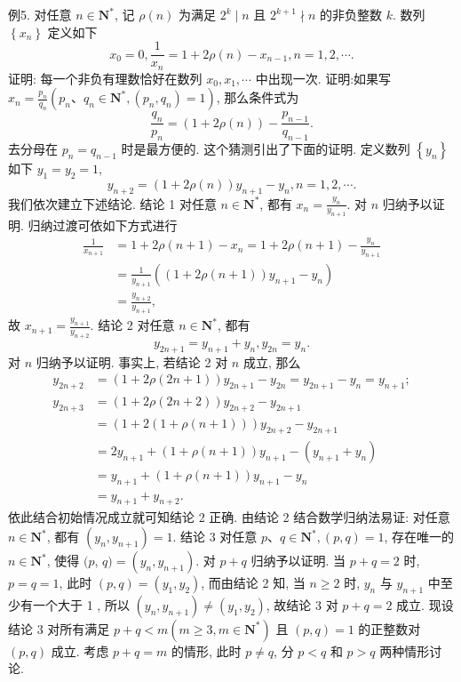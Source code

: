 例5. 对任意 $n \in \mathbf{N}^*$, 记 $\rho(n)$ 为满足 $2^k \mid n$ 且 $2^{k+1} \nmid n$ 的非负整数 $k$.
数列 $\left\{x_n\right\}$ 定义如下
$$
x_0=0, \frac{1}{x_n}=1+2 \rho(n)-x_{n-1}, n=1,2, \cdots .
$$
证明: 每一个非负有理数恰好在数列 $x_0, x_1, \cdots$ 中出现一次.
证明:如果写 $x_n=\frac{p_n}{q_n}\left(p_n 、 q_n \in \mathbf{N}^*,\left(p_n, q_n\right)=1\right)$, 那么条件式为
$$
\frac{q_n}{p_n}=(1+2 \rho(n))-\frac{p_{n-1}}{q_{n-1}} .
$$
去分母在 $p_n=q_{n-1}$ 时是最方便的.
这个猜测引出了下面的证明.
定义数列 $\left\{y_n\right\}$ 如下 $y_1=y_2=1$,
$$
y_{n+2}=(1+2 \rho(n)) y_{n+1}-y_n, n=1,2, \cdots .
$$
我们依次建立下述结论.
结论 1 对任意 $n \in \mathbf{N}^*$, 都有 $x_n=\frac{y_n}{y_{n+1}}$.
对 $n$ 归纳予以证明.
归纳过渡可依如下方式进行
$$
\begin{aligned}
\frac{1}{x_{n+1}} & =1+2 \rho(n+1)-x_n=1+2 \rho(n+1)-\frac{y_n}{y_{n+1}} \\
& =\frac{1}{y_{n+1}}\left((1+2 \rho(n+1)) y_{n+1}-y_n\right) \\
& =\frac{y_{n+2}}{y_{n+1}},
\end{aligned}
$$
故 $x_{n+1}=\frac{y_{n+1}}{y_{n+2}}$.
结论 2 对任意 $n \in \mathbf{N}^*$, 都有
$$
y_{2 n+1}=y_{n+1}+y_n, y_{2 n}=y_n .
$$
对 $n$ 归纳予以证明.
事实上, 若结论 2 对 $n$ 成立, 那么
$$
\begin{aligned}
y_{2 n+2} & =(1+2 \rho(2 n+1)) y_{2 n+1}-y_{2 n}=y_{2 n+1}-y_n=y_{n+1} ; \\
y_{2 n+3} & =(1+2 \rho(2 n+2)) y_{2 n+2}-y_{2 n+1} \\
& =(1+2(1+\rho(n+1))) y_{2 n+2}-y_{2 n+1} \\
& =2 y_{n+1}+(1+\rho(n+1)) y_{n+1}-\left(y_{n+1}+y_n\right) \\
& =y_{n+1}+(1+\rho(n+1)) y_{n+1}-y_n \\
& =y_{n+1}+y_{n+2} .
\end{aligned}
$$
依此结合初始情况成立就可知结论 2 正确.
由结论 2 结合数学归纳法易证: 对任意 $n \in \mathbf{N}^*$, 都有 $\left(y_n, y_{n+1}\right)=1$.
结论 3 对任意 $p 、 q \in \mathbf{N}^*,(p, q)=1$, 存在唯一的 $n \in \mathbf{N}^*$, 使得 $(p$,
$q)=\left(y_n, y_{n+1}\right)$.
对 $p+q$ 归纳予以证明.
当 $p+q=2$ 时, $p=q=1$, 此时 $(p, q)=\left(y_1, y_2\right)$, 而由结论 2 知, 当 $n \geqslant 2$ 时, $y_n$ 与 $y_{n+1}$ 中至少有一个大于 1 , 所以 $\left(y_n, y_{n+1}\right) \neq \left(y_1, y_2\right)$, 故结论 3 对 $p+q=2$ 成立.
现设结论 3 对所有满足 $p+q<m\left(m \geqslant 3, m \in \mathbf{N}^*\right)$ 且 $(p, q)=1$ 的正整数对 $(p, q)$ 成立.
考虑 $p+q=m$ 的情形, 此时 $p \neq q$, 分 $p<q$ 和 $p>q$ 两种情形讨论.
